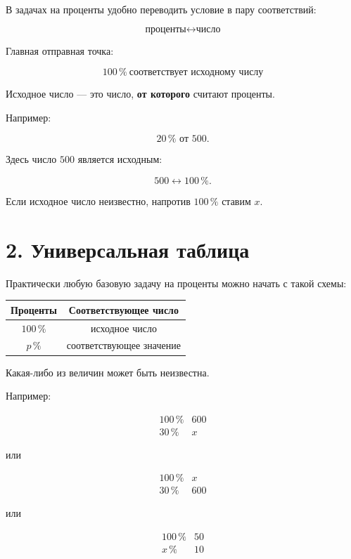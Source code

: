 \documentclass[a4paper,12pt]{article}
\newcommand{\pct}[1]{#1\,\%}
\begin{document}
В задачах на проценты удобно переводить условие в пару соответствий:

\[
\boxed{\text{проценты} \longleftrightarrow \text{число}}
\]

Главная отправная точка:

\[
\boxed{\pct{100}\ \text{соответствует исходному числу}}
\]

Исходное число --- это число, \textbf{от которого} считают проценты.

Например:

\[
\pct{20}\text{ от }500.
\]

Здесь число \(500\) является исходным:

\[
500 \longleftrightarrow \pct{100}.
\]

Если исходное число неизвестно, напротив \(\pct{100}\) ставим \(x\).

\section*{\textcolor{darkaccent}{2. Универсальная таблица}}

Практически любую базовую задачу на проценты можно начать с такой схемы:

\begin{center}
\renewcommand{\arraystretch}{1.45}
\begin{tabular}{cc}
\toprule
\textbf{Проценты} & \textbf{Соответствующее число} \\
\midrule
\(\pct{100}\) & исходное число \\
\(\pct{p}\) & соответствующее значение \\
\bottomrule
\end{tabular}
\end{center}

Какая-либо из величин может быть неизвестна.

Например:

\[
\begin{array}{c|c}
\pct{100} & 600\\
\pct{30} & x
\end{array}
\]

или

\[
\begin{array}{c|c}
\pct{100} & x\\
\pct{30} & 600
\end{array}
\]

или

\[
\begin{array}{c|c}
\pct{100} & 50\\
x\,\% & 10
\end{array}
\]
\end{document}
